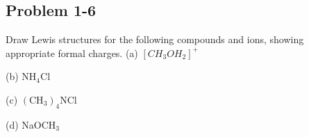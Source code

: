 \documentclass{article}[11pt]
\begin{document}
\subsection{Problem 1-6}
\label{sec:ch1p6}
\noindent
Draw Lewis structures for the following compounds and ions, showing appropriate formal charges.
\newline
\newline
(a) $\left[\mbox{$CH_{3}OH_{2}$}\right]^{+}$
\newline
\newline
\begin{center}  \end{center}
\newline
\newline
(b) NH$_{4}$Cl
\newline
\newline
\begin{center}  \hspace{0.5cm}  \end{center}
\newline
\newline
(c) $\left(\mbox{$\mbox{CH}_{3}$}\right)_{4}\mbox{NCl}$
\newline
\newline
\begin{center}  \hspace{0.5cm}  \end{center}
\newline
\newline
(d) NaOCH$_{3}$
\newline
\newline
\begin{center}  \hspace{0.5cm}  \end{center}
\newline
\end{document}
